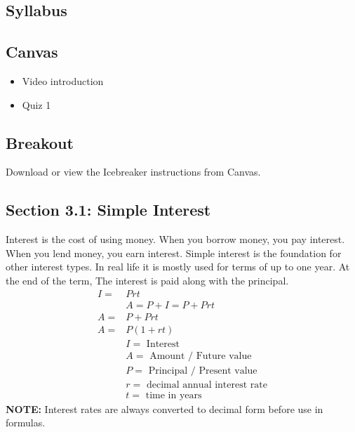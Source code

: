 \documentclass[14pt]{extarticle}
\begin{document}
\subsection{Syllabus}

\subsection{Canvas}
\begin{itemize}
	\item Video introduction
	\item Quiz 1
\end{itemize}

\subsection{Breakout}
Download or view the Icebreaker instructions from Canvas.

\subsection{Section 3.1: Simple Interest}
Interest is the cost of using money. When you borrow money, you pay interest. When you lend money, you earn interest. Simple interest is the foundation for other interest types. In real life it is mostly used for terms of up to one year. At the end of the term, The interest is paid along with the principal.
\begin{align*}
	I = &Prt \tag{1} \\
	&A = P+I= P+ Prt \\
	A = &P + Prt \tag{2} \\
	A = &P(1+rt) \tag{3} \\
	&I = \text{ Interest} \\
	&A = \text{ Amount / Future value} \\
	&P = \text{ Principal / Present value} \\
	&r = \text{ decimal annual interest rate} \\
	&t = \text{ time in years}	
\end{align*}
\textbf{NOTE:} Interest rates are always converted to decimal form before use in formulas.
\end{document}
